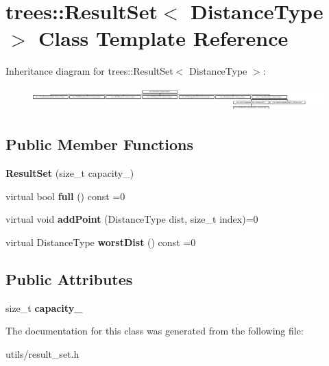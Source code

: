 \hypertarget{classtrees_1_1_result_set}{}\section{trees\+:\+:Result\+Set$<$ Distance\+Type $>$ Class Template Reference}
\label{classtrees_1_1_result_set}
Inheritance diagram for trees\+:\+:Result\+Set$<$ Distance\+Type $>$\+:\begin{figure}[H]
\begin{center}
\leavevmode
\includegraphics[height=0.906149cm]{classtrees_1_1_result_set}
\end{center}
\end{figure}
\subsection*{Public Member Functions}
\begin{DoxyCompactItemize}
\item 
\mbox{\label{classtrees_1_1_result_set_afe172e3581433bcc46fecdbb156cde8b}} 
{\bfseries Result\+Set} (size\+\_\+t capacity\+\_\+)
\item 
\mbox{\label{classtrees_1_1_result_set_ac35ee245b34f1f37fefbe994e85f5de5}} 
virtual bool {\bfseries full} () const =0
\item 
\mbox{\label{classtrees_1_1_result_set_a168f89986f238cd4e43e8a5e80bec025}} 
virtual void {\bfseries add\+Point} (Distance\+Type dist, size\+\_\+t index)=0
\item 
\mbox{\label{classtrees_1_1_result_set_a7e060d29f148a5d54cfb3e8ac63f8c18}} 
virtual Distance\+Type {\bfseries worst\+Dist} () const =0
\end{DoxyCompactItemize}
\subsection*{Public Attributes}
\begin{DoxyCompactItemize}
\item 
\mbox{\label{classtrees_1_1_result_set_ab38709e3e9911c7ff7598ab368dfdba1}} 
size\+\_\+t {\bfseries capacity\+\_\+}
\end{DoxyCompactItemize}


The documentation for this class was generated from the following file\+:\begin{DoxyCompactItemize}
\item 
utils/result\+\_\+set.\+h\end{DoxyCompactItemize}
